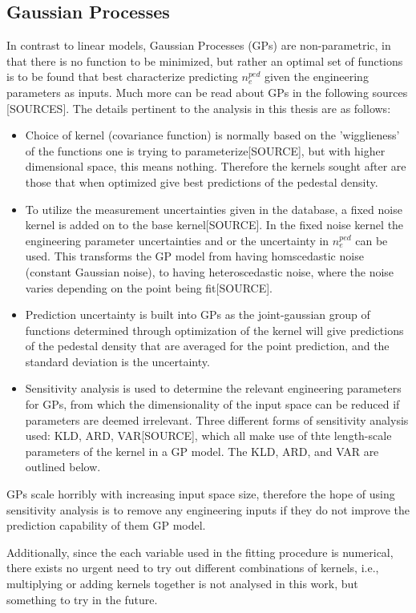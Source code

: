 \documentclass[a4paper, twoside, final, 12pt]{article}
\begin{document}
\subsection{Gaussian Processes}
In contrast to linear models, Gaussian Processes (GPs) are non-parametric, in that there is no function to be minimized, but rather an optimal set of functions is to be found that best characterize predicting $n_e^{ped}$ given the engineering parameters as inputs.
Much more can be read about GPs in the following sources [SOURCES].
The details pertinent to the analysis in this thesis are as follows:
\begin{itemize}
	\item Choice of kernel (covariance function) is normally based on the 'wigglieness' of the functions one is trying to parameterize[SOURCE], but with higher dimensional space, this means nothing. Therefore the kernels sought after are those that when optimized give best predictions of the pedestal density.
	\item To utilize the measurement uncertainties given in the database, a fixed noise kernel is added on to the base kernel[SOURCE]. In the fixed noise kernel the engineering parameter uncertainties and or the uncertainty in $n_e^{ped}$ can be used. This transforms the GP model from having homscedastic noise (constant Gaussian noise), to having heteroscedastic noise, where the noise varies depending on the point being fit[SOURCE].
	\item Prediction uncertainty is built into GPs as the joint-gaussian group of functions determined through optimization of the kernel will give predictions of the pedestal density that are averaged for the point prediction, and the standard deviation is the uncertainty. 
	\item Sensitivity analysis is used to determine the relevant engineering parameters for GPs, from which the dimensionality of the input space can be reduced if parameters are deemed irrelevant. Three different forms of sensitivity analysis used: KLD, ARD, VAR[SOURCE], which all make use of thte length-scale parameters of the kernel in a GP model. The KLD, ARD, and VAR are outlined below. 
\end{itemize}

GPs scale horribly with increasing input space size, therefore the hope of using sensitivity analysis is to remove any engineering inputs if they do not improve the prediction capability of them GP model.

Additionally, since the each variable used in the fitting procedure is numerical, there exists no urgent need to try out different combinations of kernels, i.e., multiplying or adding kernels together is not analysed in this work, but something to try in the future. 
\end{document}
